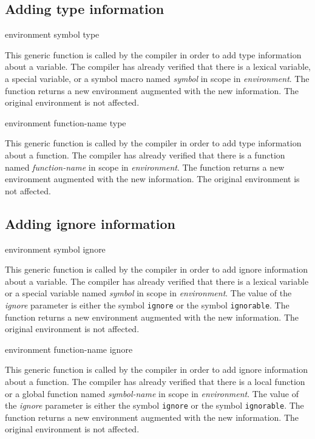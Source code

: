 \subsection{Adding type information}

 {environment symbol type}

This generic function is called by the compiler in order to add type
information about a variable.  The compiler has already verified that
there is a lexical variable, a special variable, or a symbol macro
named \textit{symbol} in scope in \textit{environment}.  The function
returns a new environment augmented with the new information.  The
original environment is not affected.

 {environment function-name type}

This generic function is called by the compiler in order to add type
information about a function.  The compiler has already verified that
there is a function named \textit{function-name} in scope in
\textit{environment}.  The function returns a new environment
augmented with the new information.  The original environment is not
affected.

\subsection{Adding ignore information}

 {environment symbol ignore}

This generic function is called by the compiler in order to add ignore
information about a variable.  The compiler has already verified that
there is a lexical variable or a special variable named
\textit{symbol} in scope in \textit{environment}.  The value of the
\textit{ignore} parameter is either the symbol \texttt{ignore} or the
symbol \texttt{ignorable}.  The function returns a new environment
augmented with the new information.  The original environment is not
affected.

 {environment function-name ignore}

This generic function is called by the compiler in order to add ignore
information about a function.  The compiler has already verified that
there is a local function or a global function named
\textit{symbol-name} in scope in \textit{environment}.  The value of
the \textit{ignore} parameter is either the symbol \texttt{ignore} or
the symbol \texttt{ignorable}.  The function returns a new environment
augmented with the new information.  The original environment is not
affected.

